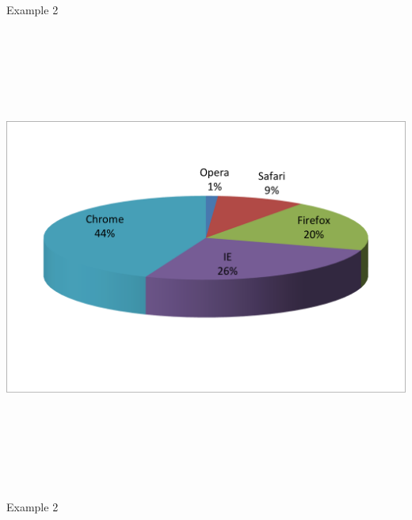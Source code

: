 \documentclass[12pt]{article}
\newcommand{\headsize}{\fontsize{35}{35} \selectfont}
\begin{document}
\newpage


\headsize \color{myyellow}
\hfill \begin{minipage}{5.75in}
\centering
Example 2
\end{minipage}

\vspace{30mm}

\centerline{\includegraphics[height=6in]{Figs/fig2d.png}}


\newpage


\headsize \color{myyellow}
\hfill \begin{minipage}{5.75in}
\centering
Example 2
\end{minipage}

\vspace{30mm}
\end{document}
